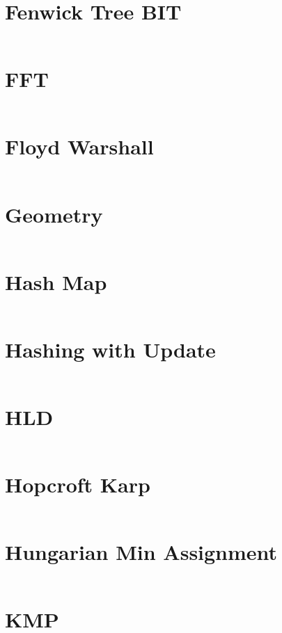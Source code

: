 \documentclass[10pt,a4paper,landscape]{article}
\begin{document}
\begin{multicols*}{3}
		
		\section{Fenwick Tree BIT}
		\inputminted{cpp}{codes/FENWICK_TREE_BIT.cpp}
		
		\section{FFT}
		\inputminted{cpp}{codes/FFT.cpp}
		
		\section{Floyd Warshall}
		\inputminted{cpp}{codes/FLOYD_WARSHALL.cpp}
		
		\section{Geometry}
		\inputminted{cpp}{codes/GEOMETRY.cpp}
		
		\section{Hash Map}
		\inputminted{cpp}{codes/HASH_MAP.cpp}
		
		\section{Hashing with Update}
		\inputminted{cpp}{codes/HASHING_WITH_UPDATE.cpp}
		
		\section{HLD}
		\inputminted{cpp}{codes/HLD.cpp}
		
		\section{Hopcroft Karp}
		\inputminted{cpp}{codes/HOPCROFT_KARP.cpp}
		
		\section{Hungarian Min Assignment}
		\inputminted{cpp}{codes/HUNGARIAN_MIN_ASSIGNMENT.cpp}
		
		\section{KMP}
		\inputminted{cpp}{codes/KMP.cpp}
		

\end{multicols*}
\end{document}
